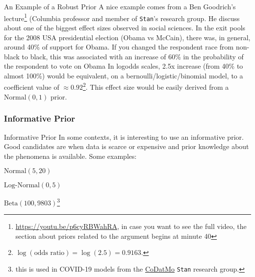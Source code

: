 \begin{frame}{An Example of a Robust Prior}
	\small
	A nice example comes from a Ben Goodrich's lecture\footnote{
		\url{https://youtu.be/p6cyRBWahRA},
		in case you want to see the full video,
		the section about priors related to the argument begins at minute 40}
	(Columbia professor and member of \texttt{Stan}'s research group.
	\vfill
	He discuss about one of the biggest effect sizes observed in social sciences.
	In the exit pools for the 2008 USA presidential election (Obama vs McCain),
	there was, in general, around 40\% of support for Obama.
	If you changed the respondent race from non-black to black,
	this was associated with an increase of 60\% in the probability of the respondent
	to vote on Obama
	\vfill
	In logodds scales, 2.5x increase (from 40\% to almost 100\%) would be equivalent,
	on a bernoulli/logistic/binomial model,
	to a coefficient value of $\approx 0.92$\footnote{
		$\log(\text{odds ratio}) = \log(2.5) = 0.9163$.}.
	This effect size would be easily derived from a $\text{Normal}(0, 1)$ prior.
\end{frame}

\subsubsection{Informative Prior}
\begin{frame}{Informative Prior}
	In some contexts, it is interesting to use an informative prior.
	Good candidates are when data is scarce or expensive and prior knowledge
	about the phenomena is available.
	\vfill
	Some examples:
	\begin{vfilleditems}
		\item $\text{Normal}(5, 20)$
		\item $\text{Log-Normal}(0, 5)$
		\item $\text{Beta}(100, 9803)$\footnote{
			this is used in COVID-19 models from the
			\href{https://codatmo.github.io}{CoDatMo} \texttt{Stan}
			research group.}
	\end{vfilleditems}
\end{frame}
